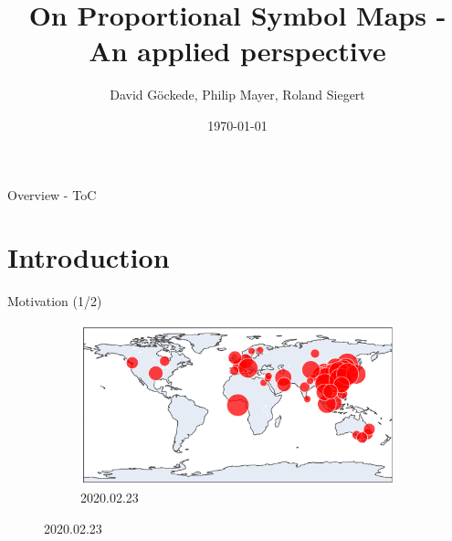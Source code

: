 \documentclass{beamer}
\title{On Proportional Symbol Maps - An applied perspective}
\date{\today}
\author{David Göckede, Philip Mayer, Roland Siegert}
\institute{Geometry Lab SS 2020}
\begin{document}
\maketitle

\begin{frame}{Overview - ToC}
  \tableofcontents
\end{frame}

\section{Introduction}

\begin{frame}{Motivation (1/2)}

  \begin{figure}[!b]
    \centering
    \begin{subfigure}[b]{\linewidth}
      \centering
      \includegraphics[width=0.9\linewidth]{../covid_spread_20200223.png}
      \caption{2020.02.23}
    \end{subfigure}
  \end{figure}

\end{frame}
\end{document}
